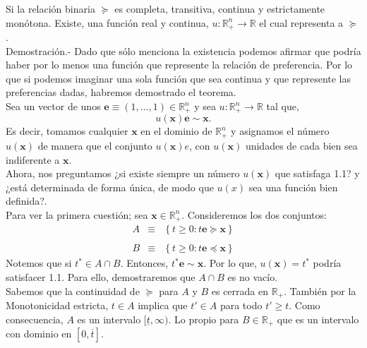 \begin{teo}
    Si la relación binaria $\succeq$ es completa, transitiva, continua y estrictamente monótona. Existe, una función real y continua, $u:\mathbb{R}^n_+\to \mathbb{R}$ el cual representa a $\succeq$.\\

	Demostración.-\; Dado que sólo menciona la existencia podemos afirmar que podría haber por lo menos una función que represente la relación de preferencia. Por lo que si podemos imaginar una sola función que sea continua y que represente las preferencias dadas, habremos demostrado el teorema.\\

	Sea un vector de unos $\textbf{e}\equiv(1,\ldots,1)\in \mathbb{R}^n_+$ y sea $u:\mathbb{R}^n_+\to \mathbb{R}$ tal que,
	\begin{equation}
	    u(\textbf{x})\textbf{e}\sim \textbf{x}.
	\end{equation}
	Es decir, tomamos cualquier $\textbf{x}$ en el dominio de $\mathbb{R}^n_+$ y asignamos el número $u(\textbf{x})$ de manera que el conjunto $u(\textbf{x})e$, con $u(\textbf{x})$ unidades de cada bien sea indiferente a $\textbf{x}$.\\

	Ahora, nos preguntamos ¿si existe siempre un número $u(\textbf{x})$ que satisfaga 1.1? y ¿está determinada de forma única, de modo que $u(x)$ sea una función bien definida?. \\

	Para ver la primera cuestión; sea $\textbf{x}\in \mathbb{R}^n_+$.  Consideremos los dos conjuntos:
	$$
	\begin{array}{rcl}
	    A &\equiv& \left\{t\geq 0: t\textbf{e}\succeq \textbf{x}\right\}\\\\
	    B &\equiv& \left\{t\geq 0: t\textbf{e}\preceq \textbf{x}\right\}
	\end{array}
	$$
	Notemos que si $t^*\in A\cap B$. Entonces, $t^*\textbf{e}\sim \textbf{x}$. Por lo que, $u(\textbf{x})=t^*$ podría satisfacer 1.1. Para ello, demostraremos que $A\cap B$ es no vacío. \\

	Sabemos que la continuidad de $\succeq$ para $A$ y $B$ es cerrada en $\mathbb{R}_+$. También por la Monotonicidad estricta, $t\in A$ implica que $t'\in A$ para todo $t'\geq t$. Como consecuencia, $A$ es un intervalo $[\underline{t},\infty)$. Lo propio para $B\in \mathbb{R}_+$ que es un intervalo con dominio en $[0,\overline{t}]$.\\


\end{teo}
